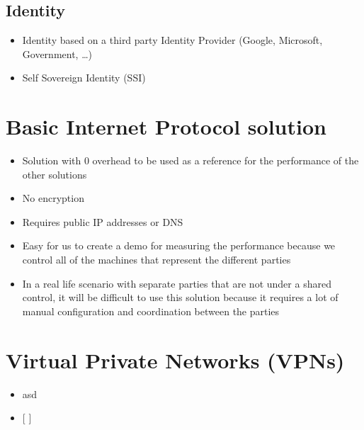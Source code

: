 \hypertarget{notes__02025-identity.md}{}
\hypertarget{notes__02025-identity.md__identity}{%
\subsection{Identity}\label{notes__02025-identity.md__identity}}

\begin{itemize}
\tightlist
\item
  Identity based on a third party Identity Provider (Google, Microsoft,
  Government, \ldots)
\item
  Self Sovereign Identity (SSI)
\end{itemize}

\hypertarget{notes__02040-basic-ip.md}{}
\hypertarget{notes__02040-basic-ip.md__basic-internet-protocol-solution}{%
\section{Basic Internet Protocol
solution}\label{notes__02040-basic-ip.md__basic-internet-protocol-solution}}

\begin{itemize}
\tightlist
\item
  Solution with 0 overhead to be used as a reference for the performance
  of the other solutions
\item
  No encryption
\item
  Requires public IP addresses or DNS
\item
  Easy for us to create a demo for measuring the performance because we
  control all of the machines that represent the different parties
\item
  In a real life scenario with separate parties that are not under a
  shared control, it will be difficult to use this solution because it
  requires a lot of manual configuration and coordination between the
  parties
\end{itemize}

\hypertarget{notes__02050-vpns.md}{}
\hypertarget{notes__02050-vpns.md__virtual-private-networks-vpns}{%
\section{Virtual Private Networks
(VPNs)}\label{notes__02050-vpns.md__virtual-private-networks-vpns}}

\begin{itemize}
\item
  asd
\item
  {[} {]}
\end{itemize}

